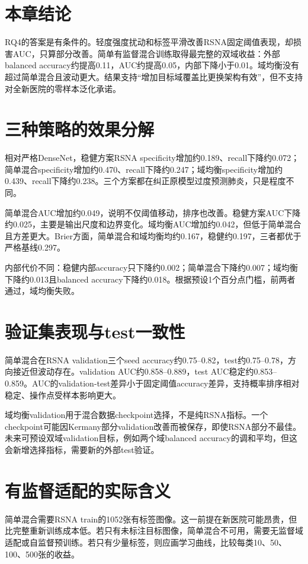 \section{本章结论}

RQ4的答案是有条件的。轻度强度扰动和标签平滑改善RSNA固定阈值表现，却损害AUC，只算部分改善。简单有监督混合训练取得最完整的双域收益：外部balanced accuracy约提高0.11，AUC约提高0.05，内部下降小于0.01。域均衡没有超过简单混合且波动更大。结果支持“增加目标域覆盖比更换架构有效”，但不支持对全新医院的零样本泛化承诺。

\section{三种策略的效果分解}

相对严格DenseNet，稳健方案RSNA specificity增加约0.189、recall下降约0.072；简单混合specificity增加约0.470、recall下降约0.247；域均衡specificity增加约0.439、recall下降约0.238。三个方案都在纠正原模型过度预测肺炎，只是程度不同。

简单混合AUC增加约0.049，说明不仅阈值移动，排序也改善。稳健方案AUC下降约0.025，主要是输出尺度和边界变化。域均衡AUC增加约0.042，但低于简单混合且方差更大。Brier方面，简单混合和域均衡均约0.167，稳健约0.197，三者都优于严格基线0.297。

内部代价不同：稳健内部accuracy只下降约0.002；简单混合下降约0.007；域均衡下降约0.013且balanced accuracy下降约0.018。根据预设1个百分点门槛，前两者通过，域均衡失败。

\section{验证集表现与test一致性}

简单混合在RSNA validation三个seed accuracy约0.75--0.82，test约0.75--0.78，方向接近但波动存在。validation AUC约0.858--0.889，test AUC稳定约0.853--0.859。AUC的validation-test差异小于固定阈值accuracy差异，支持概率排序相对稳定、操作点受样本影响更大。

域均衡validation用于混合数据checkpoint选择，不是纯RSNA指标。一个checkpoint可能因Kermany部分validation改善而被保存，即使RSNA部分不最佳。未来可预设双域validation目标，例如两个域balanced accuracy的调和平均，但这会新增选择指标，需要新的外部test验证。

\section{有监督适配的实际含义}

简单混合需要RSNA train的1052张有标签图像。这一前提在新医院可能昂贵，但比完整重新训练成本低。若只有未标注目标图像，简单混合不可用，需要无监督域适配或自监督预训练。若只有少量标签，则应画学习曲线，比较每类10、50、100、500张的收益。

